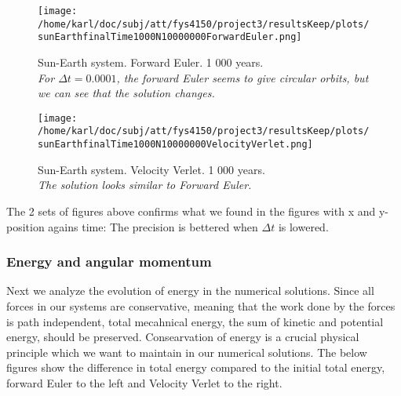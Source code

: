 \documentclass{article}
\begin{document}
\begin{minipage}{.49\textwidth} 
	\begin{figure}[H]
		\centering
		\texttt{[image: /home/karl/doc/subj/att/fys4150/project3/resultsKeep/plots/sunEarthfinalTime1000N10000000ForwardEuler.png]}
		\caption{Sun-Earth system. Forward Euler. 1 000 years. \\ \textit{For $\Delta t = 0.0001$, the forward Euler seems to give circular orbits, but we can see that the solution changes.}}
		\label{1}
	\end{figure}
\end{minipage}\hfill
\begin{minipage}{.49\textwidth} 
	\begin{figure}[H]
		\centering
		\texttt{[image: /home/karl/doc/subj/att/fys4150/project3/resultsKeep/plots/sunEarthfinalTime1000N10000000VelocityVerlet.png]}
		\caption{Sun-Earth system. Velocity Verlet. 1 000 years. \\ \textit{The solution looks similar to Forward Euler.}}
		\label{1}
	\end{figure}
\end{minipage}\hfill
\vspace{2ex}

The 2 sets of figures above confirms what we found in the figures with x and y-position agains time: The precision is bettered when $\Delta t$ is lowered. 

\subsubsection{Energy and angular momentum}
Next we analyze the evolution of energy in the numerical solutions. Since all forces in our systems are conservative, meaning that the work done by the forces is path independent, total mecahnical energy, the sum of kinetic and potential energy, should be preserved. Consearvation of energy is a crucial physical principle which we want to maintain in our numerical solutions. The below figures show the difference in total energy compared to the initial total energy, forward Euler to the left and Velocity Verlet to the right.
\end{document}
